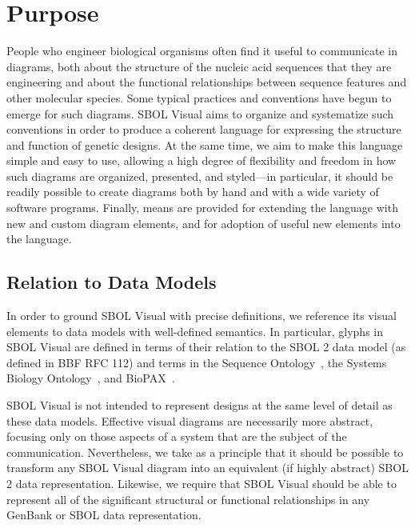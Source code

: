 \section{Purpose}

People who engineer biological organisms often find it useful to communicate in
diagrams, both about the structure of the nucleic acid sequences that they are engineering 
and about the functional relationships between sequence features and other molecular species.
%
Some typical practices and conventions have begun to emerge for such
diagrams.  SBOL Visual aims to organize and systematize such
conventions in order to produce a coherent language for expressing
the structure and function 
of genetic designs. 
%
At the same time, we aim to make this language simple and easy to use,
allowing a high degree of flexibility and freedom in how such diagrams are organized, presented, and
styled---in particular, it should be readily possible to create
diagrams both by hand and with a wide variety of software programs.
%
Finally, means are provided for extending the language with new and
custom diagram elements, and for adoption of useful new elements into
the language.

\subsection{Relation to Data Models}

In order to ground SBOL Visual with precise definitions, we reference its visual elements to data models with well-defined semantics.
In particular, glyphs in SBOL Visual are defined in terms of their relation to the SBOL 2 data model (as defined in BBF RFC 112) and terms in the Sequence Ontology~\citep{SequenceOntology},
the Systems Biology Ontology~\citep{SBO}, and BioPAX~\citep{BioPAX}.

SBOL Visual is not intended to represent designs at the same level of detail as these data models.
Effective visual diagrams are necessarily more abstract, focusing only on those aspects of a system that are the subject of the communication.
Nevertheless, we take as a principle that it should be possible to transform any SBOL Visual diagram into an equivalent (if highly abstract) SBOL 2 data representation.
Likewise, we require that SBOL Visual should be able to represent all of the significant structural or functional relationships in any GenBank or SBOL data representation.
